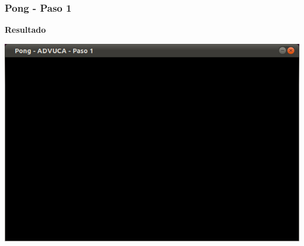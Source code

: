 \begin{frame}
	\frametitle{Pong - Paso 1}
	
    \begin{center}
        \textbf{Resultado}
    \end{center}
	
    \begin{center}
		\includegraphics[scale=0.4]{img/pong-advuca-1.png}
    \end{center}	

\end{frame}

